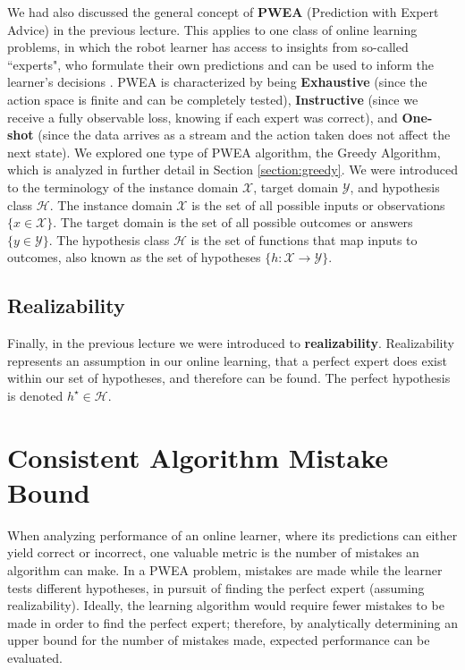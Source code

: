 \documentclass[11pt]{article}
\begin{document}
We had also discussed the general concept of \textbf{PWEA} (Prediction with Expert Advice) in the previous lecture. This applies to one class of online learning problems, in which the robot learner has access to insights from so-called ``experts", who formulate their own predictions and can be used to inform the learner's decisions \cite{hoi2018online}. PWEA is characterized by being \textbf{Exhaustive} (since the action space is finite and can be completely tested), \textbf{Instructive} (since we receive a fully observable loss, knowing if each expert was correct), and \textbf{One-shot} (since the data arrives as a stream and the action taken does not affect the next state). We explored one type of PWEA algorithm, the Greedy Algorithm, which is analyzed in further detail in Section \ref{section:greedy}. We were introduced to the terminology of the instance domain $\mathcal{X}$, target domain $\mathcal{Y}$, and hypothesis class $\mathcal{H}$. The instance domain $\mathcal{X}$ is the set of all possible inputs or observations $\{x\in\mathcal{X}\}$. The target domain is the set of all possible outcomes or answers $\{y\in\mathcal{Y}\}$. The hypothesis class $\mathcal{H}$ is the set of functions that map inputs to outcomes, also known as the set of hypotheses $\{h:\mathcal{X}\rightarrow\mathcal{Y}\}$. 

\subsection{Realizability}

Finally, in the previous lecture we were introduced to \textbf{realizability}. Realizability represents an assumption in our online learning, that a perfect expert does exist within our set of hypotheses, and therefore can be found. The perfect hypothesis is denoted $h^\star\in\mathcal{H}$.

\section{Consistent Algorithm Mistake Bound}\label{section:mistake_bound}



When analyzing performance of an online learner, where its predictions can either yield correct or incorrect, one valuable metric is the number of mistakes an algorithm can make. In a PWEA problem, mistakes are made while the learner tests different hypotheses, in pursuit of finding the perfect expert (assuming realizability). Ideally, the learning algorithm would require fewer mistakes to be made in order to find the perfect expert; therefore, by analytically determining an upper bound for the number of mistakes made, expected performance can be evaluated.
\end{document}
